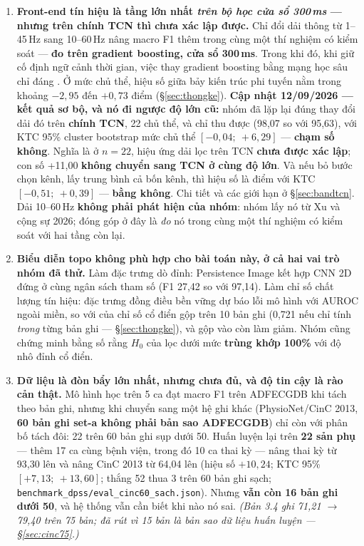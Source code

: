 \begin{enumerate}[leftmargin=1.5em,itemsep=4pt]
\item \textbf{Front-end tín hiệu là tầng lớn nhất \textit{trên bộ học cửa sổ 300\,ms} --- nhưng trên
chính TCN thì chưa xác lập được.}
Chỉ đổi dải thông từ 1--45\,Hz sang 10--60\,Hz nâng macro F1 thêm  trong cùng một
thí nghiệm có kiểm soát --- \textbf{đo trên gradient boosting, cửa sổ 300\,ms}. Trong khi đó, khi giữ
cố định ngữ cảnh thời gian, việc thay gradient boosting bằng mạng học sâu chỉ đáng .
Ở mức chủ thể, hiệu số giữa bảy kiến trúc phi tuyến nằm trong khoảng $-2{,}95$ đến $+0{,}73$ điểm
(\S\ref{sec:thongke}).
\textbf{Cập nhật 12/09/2026 --- kết quả sơ bộ, và nó đi ngược độ lớn cũ:} nhóm đã lặp lại đúng thay đổi
dải đó trên \textbf{chính TCN}, 22 chủ thể, và chỉ thu được  (98,07 so với 95,63), với
KTC 95\% cluster bootstrap mức chủ thể $[-0{,}04;\ +6{,}29]$ --- \textbf{chạm số không}. Nghĩa là ở
$n=22$, hiệu ứng dải lọc trên TCN \textbf{chưa được xác lập}; con số +11,00 \textbf{không chuyển sang
TCN ở cùng độ lớn}. Và nếu bỏ bước chọn kênh, lấy trung bình cả bốn kênh, thì hiệu số là
 điểm với KTC $[-0{,}51;\ +0{,}39]$ --- \textbf{bằng không}. Chi tiết và các giới hạn
ở \S\ref{sec:bandtcn}.
Dải 10--60\,Hz \textbf{không phải phát hiện của nhóm}: nhóm lấy nó từ Xu và cộng
sự 2026; đóng góp ở đây là \textit{đo} nó trong cùng một thí nghiệm có kiểm soát với hai tầng còn lại.

\item \textbf{Biểu diễn topo không phù hợp cho bài toán này, ở cả hai vai trò nhóm đã thử.}
Làm đặc trưng dò đỉnh: Persistence Image kết hợp CNN 2D đứng  ở cùng
ngân sách tham số (F1 27,42 so với 97,14). Làm chỉ số chất lượng tín hiệu: đặc trưng đồng điều bền vững
dự báo lỗi mô hình với AUROC  ngoài miền, so với  của chỉ số cổ điển gộp trên
10 bản ghi (0,721 nếu chỉ tính \textit{trong} từng bản ghi --- \S\ref{sec:thongke}), và gộp vào
còn làm giảm. Nhóm cũng chứng minh bằng số rằng $H_0$ của lọc dưới mức \textbf{trùng khớp 100\%} với
độ nhô đỉnh cổ điển.

\item \textbf{Dữ liệu là đòn bẩy lớn nhất, nhưng chưa đủ, và độ tin cậy là rào cản thật.}
Mô hình học trên 5 ca đạt macro F1  trên ADFECGDB khi tách theo bản ghi, nhưng khi chuyển sang
một hệ ghi khác (PhysioNet/CinC 2013, \textbf{60 bản ghi set-a không phải bản sao ADFECGDB}) chỉ còn
 với phân bố tách đôi: 22 trên 60 bản ghi sụp dưới 50. Huấn luyện lại trên \textbf{22 sản phụ} ---
thêm 17 ca cùng bệnh viện, trong đó 10 ca thai kỳ --- nâng thai kỳ từ 93,30 lên  và nâng CinC 2013
từ 64,04 lên  (hiệu số $+10{,}24$; KTC 95\% $[+7{,}13;\ +13{,}60]$; thắng 52 thua 3 trên 60 bản
ghi sạch; \texttt{benchmark\_dpss/eval\_cinc60\_sach.json}). Nhưng \textbf{vẫn còn 16 bản ghi dưới 50}, và
hệ thống vẫn cần biết khi nào nó sai. \textit{(Bản 3.4 ghi 71,21 $\to$ 79,40 trên 75 bản; đã rút vì 15 bản
là bản sao dữ liệu huấn luyện --- \S\ref{sec:cinc75}.)}
\end{enumerate}

